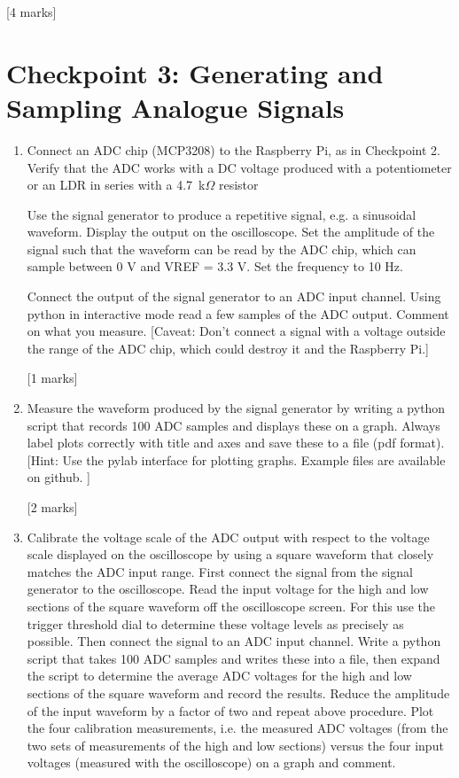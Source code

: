 \begin{enumerate}
\hfill [4 marks]\\

\end{enumerate}



\newpage
\section{Checkpoint 3:  Generating and Sampling Analogue Signals}

\begin{enumerate}

\item [3.1.] Connect an ADC chip (MCP3208) to the Raspberry Pi, as in Checkpoint 2. Verify that the ADC works with a DC voltage produced with a potentiometer or an LDR in series with a 4.7~k$\Omega$ resistor 

Use the signal generator to produce a repetitive signal, e.g. a sinusoidal waveform. Display the output on the oscilloscope. Set the amplitude of the signal such that the waveform can be read by the ADC chip, which can sample between 0 V and VREF = 3.3 V. Set the frequency to 10 Hz.  

Connect the output of the signal generator to an ADC input channel. Using python in interactive mode read a few samples of the ADC output. Comment on what you measure. [Caveat: Don't connect a signal with a voltage outside the range of the ADC chip, which could destroy it and the Raspberry Pi.] 

\hfill [1 marks]\\

\item [3.2.] Measure the waveform produced by the signal generator by writing a python script that records 100 ADC samples and displays these on a graph. Always label plots correctly with title and axes and save these to a file (pdf format). 
[Hint: Use the pylab interface for plotting graphs. Example files are available on github. ]

\hfill [2 marks] \\

\item [3.3.] Calibrate the voltage scale of the ADC output with respect to the voltage scale displayed on the oscilloscope by using a square waveform that closely matches the ADC input range.   First connect the signal from the signal generator to the oscilloscope. Read the input voltage for the high and low sections of the square waveform off the oscilloscope screen. For this use the trigger threshold dial to determine these voltage levels as precisely as possible. Then connect the signal to an ADC input channel. Write a python script that takes 100 ADC samples and writes these into a file, then expand the script to determine the average ADC voltages for the high and low sections of the square waveform and record the results. Reduce the amplitude of the input waveform by a factor of two and repeat above procedure. Plot the four calibration measurements, i.e. the measured ADC voltages (from the two sets of measurements of the  high and low sections) versus the four input voltages (measured with the oscilloscope) on a graph and comment.


\end{enumerate}
